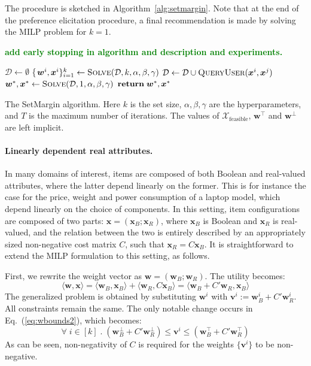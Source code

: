 \documentclass{article}
\renewcommand\[{\begin{equation}}
\renewcommand\]{\end{equation}}
\newcommand{\calvar}[1]{\ensuremath{\mathcal{#1}}}
\newcommand{\calD}{\calvar{D}}
\newcommand{\calX}{\calvar{X}}
\newcommand{\vecvar}[1]{\ensuremath{\boldsymbol{#1}}}
\newcommand{\vv}{\vecvar{v}}
\newcommand{\vw}{\vecvar{w}}
\newcommand{\vx}{\vecvar{x}}
\newcommand{\stefano}[1]{{\bf \textcolor{green}{{\fbox{Stefano:} #1}}}}
\begin{document}
The procedure is sketched in
Algorithm~\ref{alg:setmargin}. Note that at the end of the preference
elicitation procedure, a final recommendation is made by solving the
MILP problem for $k=1$.

\stefano{add early stopping in algorithm and description and experiments.}

\begin{algorithm}
{\footnotesize
\begin{algorithmic}[1]
        \State $\calD \gets \emptyset$
            \State \{$\vw^{i}, \vx^{i}\}_{i=1}^k \gets \text{{\sc Solve}}(\calD, k, \alpha, \beta, \gamma)$
            \For{$\vx^{i},\vx^{j} \in \{ \vx^{1}, \ldots, \vx^{k} \} \; \text{{\bf s.t.}} \; i < j$}
                \State $\calD \gets \calD \cup \text{{\sc QueryUser}}(\vx^{i},\vx^{j})$
            \EndFor
        \EndFor
        \State $\vw^*, \vx^* \gets \text{{\sc Solve}}(\calD, 1, \alpha, \beta, \gamma)$
        \State ${\bf return}\; \vw^*, \vx^*$
    \EndProcedure
\end{algorithmic}
}
\caption{\label{alg:setmargin} The {\sc SetMargin} algorithm. Here $k$ is the
set size, $\alpha,\beta,\gamma$ are the hyperparameters, and $T$ is the maximum
number of iterations. The values of $\calX_\text{feasible}$, $\vw^\top$ and
$\vw^\bot$ are left implicit.}
\end{algorithm}

\paragraph{Linearly dependent real attributes.} In many domains of interest,
items are composed of both Boolean and real-valued attributes, where the latter
depend linearly  on the former. This is for instance the case for the price,
weight and power consumption of a laptop model, which depend linearly on the
choice of components.
%
In this setting, item configurations are composed of two parts: $\vx =
(\vx_B;\vx_R)$, where $\vx_B$ is Boolean and $\vx_R$ is real-valued, and the
relation between the two is entirely described by an appropriately sized
non-negative cost matrix $C$, such that $\vx_R = C \vx_B$. It is
straightforward to extend the MILP formulation to this setting, as follows.

First, we rewrite the weight vector as $\vw = (\vw_B;\vw_R)$. The utility
becomes:
%
$$ \langle \vw, \vx \rangle = \langle \vw_B, \vx_B \rangle + \langle \vw_R, C \vx_B \rangle = \langle \vw_B + C' \vw_R, \vx_B \rangle $$
%
The generalized problem is obtained by substituting $\vw^i$ with $\vv^i :=
\vw_B^i + C' \vw_R^i$.  All constraints remain the same. The only notable
change occurs in Eq.~(\ref{eq:wbounds2}), which becomes:
%
$$ \forall \; i \in [k] \;.\; (\vw_B^\bot + C' \vw_R^\bot) \le \vv^i \le (\vw_B^\top + C' \vw_R^\top)$$
%
As can be seen, non-negativity of $C$ is required for the weights $\{\vv^i\}$
to be non-negative.
\end{document}
